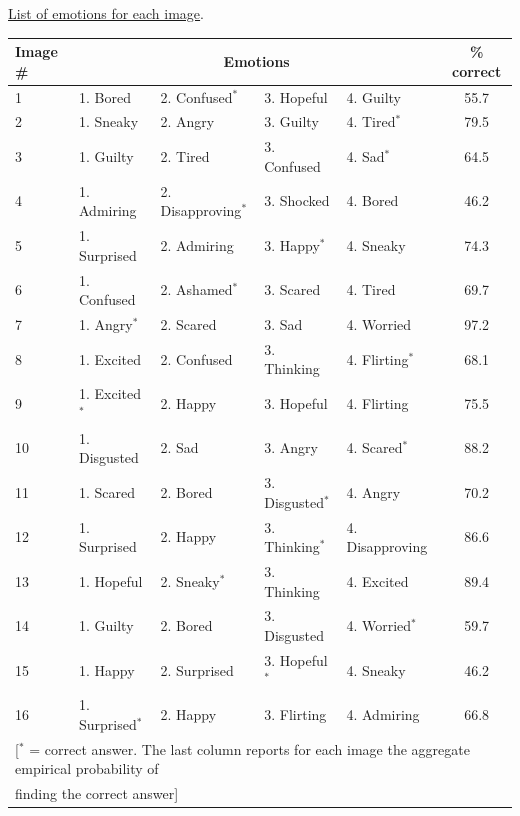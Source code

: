 \documentclass[11pt]{article}
\begin{document}
{\begin{table}[htpb] 
\small
\begin{flushleft}
\noindent \underline{List of emotions for each image}. \par \medskip

\end{flushleft}

\begin{tabular}{lllllc}  
Image \#  & \multicolumn{4}{c}{Emotions} & \% correct\\  \midrule 
1 & 1. Bored & 2. Confused$^*$ &3. Hopeful & 4. Guilty	& 55.7 \\
2 & 1. Sneaky & 2. Angry & 3. Guilty & 4. Tired$^*$ 	& 79.5\\
3 & 1. Guilty & 2. Tired & 3. Confused & 4. Sad$^*$ 	& 64.5\\
4 & 1. Admiring & 2. Disapproving$^*$ & 3. Shocked & 4. Bored 	& 46.2 \\
5 & 1. Surprised & 2. Admiring & 3. Happy$^*$ & 4. Sneaky 	& 74.3\\
6 & 1. Confused & 2. Ashamed$^*$ & 3. Scared & 4. Tired 	& 69.7 \\
7 & 1. Angry$^*$ & 2. Scared & 3. Sad & 4. Worried 	& 97.2 \\
8 & 1. Excited & 2. Confused & 3. Thinking & 4. Flirting$^*$ & 68.1\\
9 & 1. Excited$^*$ & 2. Happy & 3. Hopeful & 4. Flirting & 75.5\\
10 & 1. Disgusted & 2. Sad & 3. Angry & 4. Scared$^*$ & 88.2\\
11 & 1. Scared & 2. Bored & 3. Disgusted$^*$ & 4. Angry & 70.2\\
12 & 1. Surprised & 2. Happy & 3. Thinking$^*$ & 4. Disapproving  & 86.6\\
13 & 1. Hopeful & 2. Sneaky$^*$ & 3. Thinking & 4. Excited	& 89.4 \\
14 & 1. Guilty & 2. Bored & 3. Disgusted & 4. Worried$^*$ 	& 59.7 \\ 
15 & 1. Happy & 2. Surprised & 3. Hopeful$^*$ & 4. Sneaky & 46.2 \\
16 & 1. Surprised$^*$ & 2. Happy & 3. Flirting & 4. Admiring & 66.8\\ \midrule
\multicolumn{6}{l}{\footnotesize [$^*$ = correct answer. The last column reports for each image the aggregate empirical probability of} \\ 
\multicolumn{6}{l}{\footnotesize  finding the correct answer]}
\end{tabular} 
\end{table}  
 
}
\end{document}

